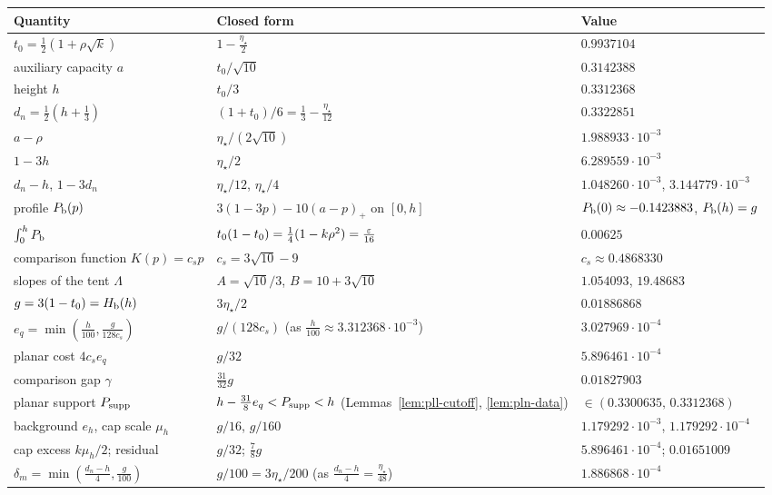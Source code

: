 \begin{table}[ht]
\centering\footnotesize
\renewcommand{\arraystretch}{1.15}
\begin{tabular}{@{}p{}p{}p{}@{}}
\toprule
Quantity & Closed form & Value\\
\midrule
$t_0=\frac12(1+\rho\sqrt k)$ & $1-\frac{\eta_\star}2$ & $0.9937104$\\
auxiliary capacity $a$ & $t_0/\sqrt{10}$ & $0.3142388$\\
height $h$ & $t_0/3$ & $0.3312368$\\
$d_n=\frac12(h+\frac13)$ & $(1+t_0)/6=\frac13-\frac{\eta_\star}{12}$ & $0.3322851$\\
$a-\rho$ & $\eta_\star/(2\sqrt{10})$ & $1.988933\cdot10^{-3}$\\
$1-3h$ & $\eta_\star/2$ & $6.289559\cdot10^{-3}$\\
$d_n-h$, $1-3d_n$ & $\eta_\star/12$, $\eta_\star/4$ & $1.048260\cdot10^{-3}$, $3.144779\cdot10^{-3}$\\
\midrule
profile $P_{\mathrm b}(p)$ & $3(1-3p)-10(a-p)_+$ on $[0,h]$ & $P_{\mathrm b}(0)\approx-0.1423883$, $P_{\mathrm b}(h)=g$\\
$\int_0^hP_{\mathrm b}$ & $t_0(1-t_0)=\frac14(1-k\rho^2)=\frac{\varepsilon}{16}$ & $0.00625$\\
comparison function $K(p)=c_sp$ & $c_s=3\sqrt{10}-9$ & $c_s\approx0.4868330$\\
slopes of the tent $\Lambda$ & $A=\sqrt{10}/3$, $B=10+3\sqrt{10}$ & $1.054093$, $19.48683$\\
$g=3(1-t_0)=H_{\mathrm b}(h)$ & $3\eta_\star/2$ & $0.01886868$\\
$e_q=\min(\frac h{100},\frac g{128c_s})$ & $g/(128c_s)$ (as $\frac h{100}\approx3.312368\cdot10^{-3}$) & $3.027969\cdot10^{-4}$\\
planar cost $4c_se_q$ & $g/32$ & $5.896461\cdot10^{-4}$\\
comparison gap $\gamma$ & $\frac{31}{32}g$ & $0.01827903$\\
planar support $P_{\rm supp}$ & $h-\frac{31}8e_q<P_{\rm supp}<h$ (Lemmas~\ref{lem:pll-cutoff}, \ref{lem:pln-data}) & $\in(0.3300635,\,0.3312368)$\\
\midrule
background $e_h$, cap scale $\mu_h$ & $g/16$, $g/160$ & $1.179292\cdot10^{-3}$, $1.179292\cdot10^{-4}$\\
cap excess $k\mu_h/2$; residual & $g/32$; $\frac78g$ & $5.896461\cdot10^{-4}$; $0.01651009$\\
$\delta_m=\min(\frac{d_n-h}4,\frac g{100})$ & $g/100=3\eta_\star/200$ (as $\frac{d_n-h}4=\frac{\eta_\star}{48}$) & $1.886868\cdot10^{-4}$\\

\end{tabular}
\end{table}
